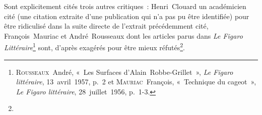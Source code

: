 \documentclass[12pt, a4paper]{article}
\begin{document}
Sont explicitement cités trois autres critiques~: Henri~Clouard un académicien cité (une citation extraite d'une publication qui n'a pas pu être identifiée) pour être ridiculisé dans la suite directe de l'extrait précédemment cité, François~Mauriac et André~Rousseaux dont les articles parus dans \textit{Le Figaro Littéraire}\footnote{\textsc{Rousseaux}~André, «~Les Surfaces d’Alain~Robbe-Grillet~», \textit{Le Figaro littéraire}, 13~avril~1957, p.~2 et \textsc{Mauriac}~François, «~Technique du cageot~», \textit{Le Figaro littéraire}, 28~juillet~1956, p.~1-3.} sont, d'après \galia{} exagérés pour être mieux réfutés\footnote{}. 
\end{document}
